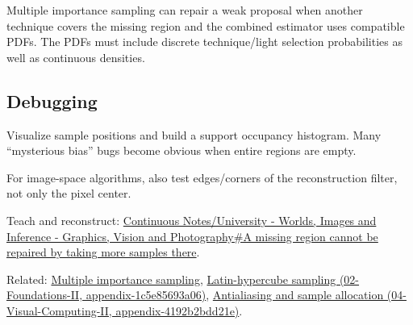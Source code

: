Multiple importance sampling can repair a weak proposal when another technique covers the missing region and the combined estimator uses compatible PDFs. The PDFs must include discrete technique/light selection probabilities as well as continuous densities.

\subsection{Debugging}\label{appendix-10308c3d753e-debugging}

Visualize sample positions and build a support occupancy histogram. Many ``mysterious bias'' bugs become obvious when entire regions are empty.

For image-space algorithms, also test edges/corners of the reconstruction filter, not only the pixel center.

Teach and reconstruct: \hyperref[03-visual-computing-i-ch007-a-missing-region-cannot-be-repaired-by-taking-more-samples-there]{Continuous Notes/University - Worlds, Images and Inference - Graphics, Vision and Photography\#A missing region cannot be repaired by taking more samples there}.

Related: \hyperref[appendix-ca8898faf1a6]{Multiple importance sampling}, \href{../02-Foundations-II/main.pdf\#nameddest=appendix-1c5e85693a06}{Latin-hypercube sampling (02-Foundations-II, appendix-1c5e85693a06)}, \href{../04-Visual-Computing-II/main.pdf\#nameddest=appendix-4192b2bdd21e}{Antialiasing and sample allocation (04-Visual-Computing-II, appendix-4192b2bdd21e)}.
